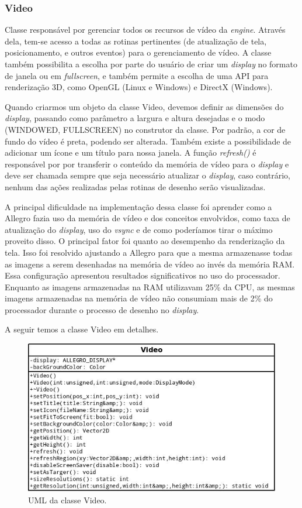 \subsubsection{Video}
%
%
Classe responsável por gerenciar todos os recursos de vídeo da \textit{engine}. Através dela, tem-se acesso a todas as rotinas pertinentes (de atualização de tela, posicionamento, e outros eventos) para o gerenciamento de vídeo. A classe também possibilita a escolha por parte do usuário de criar um \textit{display} no formato de janela ou em \textit{fullscreen}, e também permite a escolha de uma API para renderização 3D, como OpenGL (Linux e Windows) e DirectX (Windows). 
\par 
Quando criarmos um objeto da classe Video, devemos definir as dimensões do \textit{display}, passando como parâmetro a largura e altura desejadas e o modo (WINDOWED, FULLSCREEN) no construtor da classe. Por padrão, a cor de fundo do vídeo é preta, podendo ser alterada. Também existe a possibilidade de adicionar um ícone e um título para nossa janela. A função \textit{refresh()} é responsável por por transferir o conteúdo da memória de vídeo para o \textit{display} e deve ser chamada sempre que seja necessário atualizar o \textit{display}, caso contrário, nenhum das ações realizadas pelas rotinas de desenho serão visualizadas. 
\par 
A principal dificuldade na implementação dessa classe foi aprender como a Allegro fazia uso da memória de vídeo e dos conceitos envolvidos, como taxa de atualização do \textit{display}, uso do \textit{vsync} e de como poderíamos tirar o máximo proveito disso. O principal fator foi quanto ao desempenho da renderização da tela. Isso foi resolvido ajustando a Allegro para que a mesma armazenasse todas as imagens a serem desenhadas na memória de vídeo ao invés da memória RAM. Essa configuração apresentou resultados significativos no uso do processador. Enquanto as imagens armazenadas na RAM utilizavam 25\% da CPU, as mesmas imagens armazenadas na memória de vídeo não consumiam mais de 2\% do processador durante o processo de desenho no \textit{display}.
\par
A seguir temos a classe Video em detalhes.
%
%
%
%
\begin{figure}[H]
    \centering
		\caption{UML da classe Video.}
    \label{umlVideo}
    \includegraphics[scale = 0.5]{uml/video.jpeg}
\end{figure}
